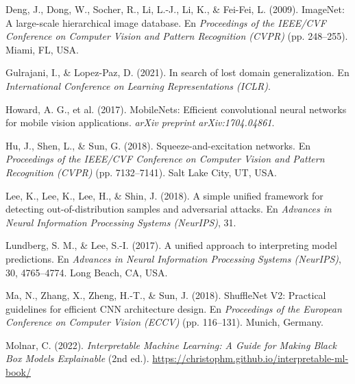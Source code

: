 \documentclass[12pt,letterpaper]{article}
\begin{document}
\par\bigskip
\noindent\hangindent=1.27cm
Deng, J., Dong, W., Socher, R., Li, L.-J., Li, K., \& Fei-Fei, L. (2009). ImageNet: A large-scale hierarchical image database. En \textit{Proceedings of the IEEE/CVF Conference on Computer Vision and Pattern Recognition (CVPR)} (pp. 248--255). Miami, FL, USA.

\par\bigskip
\noindent\hangindent=1.27cm
Gulrajani, I., \& Lopez-Paz, D. (2021). In search of lost domain generalization. En \textit{International Conference on Learning Representations (ICLR)}.

\par\bigskip
\noindent\hangindent=1.27cm
Howard, A. G., et al. (2017). MobileNets: Efficient convolutional neural networks for mobile vision applications. \textit{arXiv preprint arXiv:1704.04861}.

\par\bigskip
\noindent\hangindent=1.27cm
Hu, J., Shen, L., \& Sun, G. (2018). Squeeze-and-excitation networks. En \textit{Proceedings of the IEEE/CVF Conference on Computer Vision and Pattern Recognition (CVPR)} (pp. 7132--7141). Salt Lake City, UT, USA.

\par\bigskip
\noindent\hangindent=1.27cm
Lee, K., Lee, K., Lee, H., \& Shin, J. (2018). A simple unified framework for detecting out-of-distribution samples and adversarial attacks. En \textit{Advances in Neural Information Processing Systems (NeurIPS)}, 31.

\par\bigskip
\noindent\hangindent=1.27cm
Lundberg, S. M., \& Lee, S.-I. (2017). A unified approach to interpreting model predictions. En \textit{Advances in Neural Information Processing Systems (NeurIPS)}, 30, 4765--4774. Long Beach, CA, USA.

\par\bigskip
\noindent\hangindent=1.27cm
Ma, N., Zhang, X., Zheng, H.-T., \& Sun, J. (2018). ShuffleNet V2: Practical guidelines for efficient CNN architecture design. En \textit{Proceedings of the European Conference on Computer Vision (ECCV)} (pp. 116--131). Munich, Germany.

\par\bigskip
\noindent\hangindent=1.27cm
Molnar, C. (2022). \textit{Interpretable Machine Learning: A Guide for Making Black Box Models Explainable} (2nd ed.). \url{https://christophm.github.io/interpretable-ml-book/}
\end{document}
